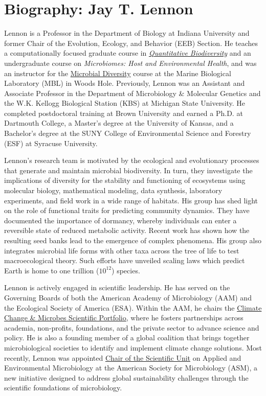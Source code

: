 \documentclass[11pt]{article}
\begin{document}
\section*{Biography: Jay T. Lennon}

Lennon is a Professor in the Department of Biology at Indiana University and former Chair of the Evolution, Ecology, and Behavior (EEB) Section. He teaches a computationally focused graduate course in \href{https://github.com/QuantitativeBiodiversity}{\textit{Quantitative Biodiversity}} and an undergraduate course on \textit{Microbiomes: Host and Environmental Health}, and was an instructor for the \href{https://tinyurl.com/2x3f57ws}{Microbial Diversity} course at the Marine Biological Laboratory (MBL) in Woods Hole. Previously, Lennon was an Assistant and Associate Professor in the Department of Microbiology \& Molecular Genetics and the W.K. Kellogg Biological Station (KBS) at Michigan State University. He completed postdoctoral training at Brown University and earned a Ph.D. at Dartmouth College, a Master’s degree at the University of Kansas, and a Bachelor’s degree at the SUNY College of Environmental Science and Forestry (ESF) at Syracuse University.

Lennon’s research team is motivated by the ecological and evolutionary processes that generate and maintain microbial biodiversity. In turn, they investigate the implications of diversity for the stability and functioning of ecosystems using molecular biology, mathematical modeling, data synthesis, laboratory experiments, and field work in a wide range of habitats. His group has shed light on the role of functional traits for predicting community dynamics. They have documented the importance of dormancy, whereby individuals can enter a reversible state of reduced metabolic activity. Recent work has shown how the resulting seed banks lead to the emergence of complex phenomena. His group also integrates microbial life forms with other taxa across the tree of life to test macroecological theory. Such efforts have unveiled scaling laws which predict Earth is home to one trillion ($10^{12}$) species.

Lennon is actively engaged in scientific leadership. He has served on the Governing Boards of both the American Academy of Microbiology (AAM) and the Ecological Society of America (ESA). Within the AAM, he chairs the \href{https://asm.org/academy/climate-change-and-microbes-scientific-portfolio}{Climate Change \& Microbes Scientific Portfolio}, where he fosters partnerships across academia, non-profits, foundations, and the private sector to advance science and policy. He is also a founding member of a global coalition that brings together microbiological societies to identify and implement climate change solutions. Most recently, Lennon was appointed \href{https://tinyurl.com/5ymw5hvs}{Chair of the Scientific Unit} on Applied and Environmental Microbiology at the American Society for Microbiology (ASM), a new initiative designed to address global sustainability challenges through the scientific foundations of microbiology.
\end{document}
